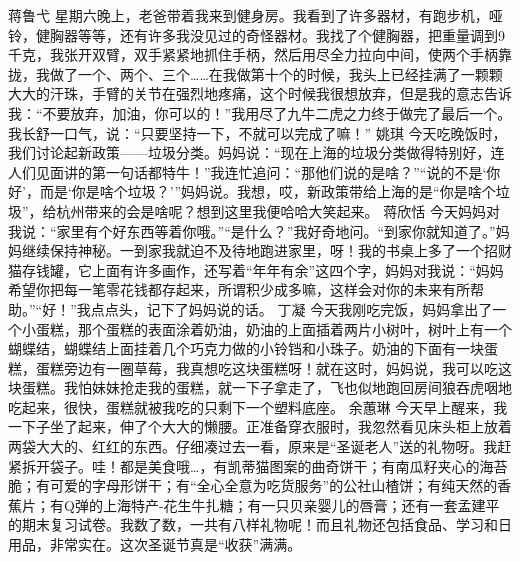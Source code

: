 {}\markdownRendererInterblockSeparator
{}蒋鲁弋\markdownRendererInterblockSeparator
{}星期六晚上，老爸带着我来到健身房。我看到了许多器材，有跑步机，哑铃，健胸器等等，还有许多我没见过的奇怪器材。我找了个健胸器，把重量调到9千克，我张开双臂，双手紧紧地抓住手柄，然后用尽全力拉向中间，使两个手柄靠拢，我做了一个、两个、三个……在我做第十个的时候，我头上已经挂满了一颗颗大大的汗珠，手臂的关节在强烈地疼痛，这个时候我很想放弃，但是我的意志告诉我：“不要放弃，加油，你可以的！”我用尽了九牛二虎之力终于做完了最后一个。我长舒一口气，说：“只要坚持一下，不就可以完成了嘛！”\markdownRendererInterblockSeparator
{}\markdownRendererInterblockSeparator
{}姚琪\markdownRendererInterblockSeparator
{}今天吃晚饭时，我们讨论起新政策——垃圾分类。妈妈说：“现在上海的垃圾分类做得特别好，连人们见面讲的第一句话都特牛！”我连忙追问：“那他们说的是啥？”“说的不是‘你好’，而是‘你是啥个垃圾？’”妈妈说。我想，哎，新政策带给上海的是“你是啥个垃圾”，给杭州带来的会是啥呢？想到这里我便哈哈大笑起来。\markdownRendererInterblockSeparator
{}\markdownRendererInterblockSeparator
{}蒋欣恬\markdownRendererInterblockSeparator
{}今天妈妈对我说：“家里有个好东西等着你哦。”“是什么？”我好奇地问。“到家你就知道了。”妈妈继续保持神秘。一到家我就迫不及待地跑进家里，呀！我的书桌上多了一个招财猫存钱罐，它上面有许多画作，还写着“年年有余”这四个字，妈妈对我说：“妈妈希望你把每一笔零花钱都存起来，所谓积少成多嘛，这样会对你的未来有所帮助。”“好！”我点点头，记下了妈妈说的话。 \markdownRendererInterblockSeparator
{}\markdownRendererInterblockSeparator
{}丁凝\markdownRendererInterblockSeparator
{}今天我刚吃完饭，妈妈拿出了一个小蛋糕，那个蛋糕的表面涂着奶油，奶油的上面插着两片小树叶，树叶上有一个蝴蝶结，蝴蝶结上面挂着几个巧克力做的小铃铛和小珠子。奶油的下面有一块蛋糕，蛋糕旁边有一圈草莓，我真想吃这块蛋糕呀！就在这时，妈妈说，我可以吃这块蛋糕。我怕妹妹抢走我的蛋糕，就一下子拿走了，飞也似地跑回房间狼吞虎咽地吃起来，很快，蛋糕就被我吃的只剩下一个塑料底座。\markdownRendererInterblockSeparator
{}\markdownRendererInterblockSeparator
{}余蕙琳\markdownRendererInterblockSeparator
{}今天早上醒来，我一下子坐了起来，伸了个大大的懒腰。正准备穿衣服时，我忽然看见床头柜上放着两袋大大的、红红的东西。仔细凑过去一看，原来是“圣诞老人”送的礼物呀。我赶紧拆开袋子。哇！都是美食哦…，有凯蒂猫图案的曲奇饼干；有南瓜籽夹心的海苔脆；有可爱的字母形饼干；有“全心全意为吃货服务”的公社山楂饼；有纯天然的香蕉片；有Q弹的上海特产-花生牛扎糖；有一只贝亲婴儿的唇膏；还有一套孟建平的期末复习试卷。我数了数，一共有八样礼物呢！而且礼物还包括食品、学习和日用品，非常实在。这次圣诞节真是“收获”满满。\markdownRendererInterblockSeparator
